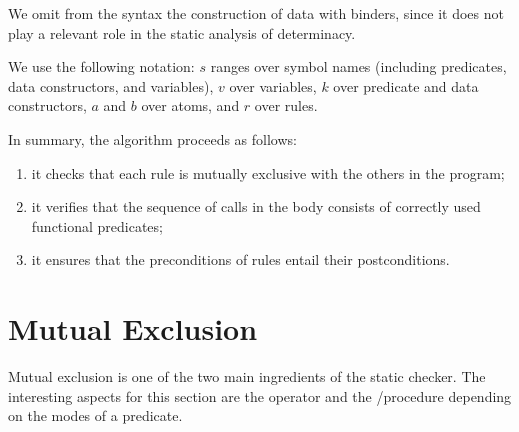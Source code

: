 We omit from the syntax the construction of data with binders, since it does
not play a relevant role in the static analysis of determinacy.

We use the following notation: $s$ ranges over symbol names (including
predicates, data constructors, and variables), $v$ over variables, $k$ over
predicate and data constructors, $a$ and $b$ over atoms, and $r$ over rules.

In summary, the algorithm proceeds as follows:
\begin{enumerate}
\item it checks that each rule is mutually exclusive with the others in the program;
\item it verifies that the sequence of calls in the body consists of correctly used functional predicates;
\item it ensures that the preconditions of rules entail their postconditions.
\end{enumerate}

\section{Mutual Exclusion}
\label{sec:hc}

Mutual exclusion is one of the two main ingredients of the static checker.
The interesting aspects
for this section are the \cut operator and the \matching/\unify procedure
depending on the modes of a predicate.




